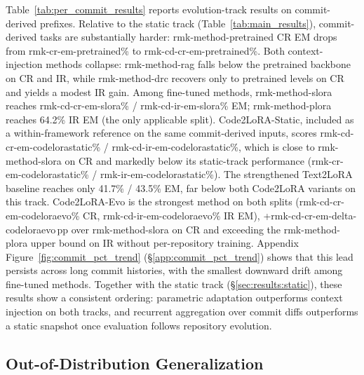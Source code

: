 \documentclass{llmxive}
\providecommand{\UseMacro}[1]{\csname rmk-#1\endcsname}
\providecommand{\codelora}{Code2LoRA\xspace}
\providecommand{\codelorastatic}{\codelora-Static\xspace}
\providecommand{\codeloraevo}{\codelora-Evo\xspace}
\providecommand{\textlora}{Text2LoRA\xspace}
\begin{document}
Table~\ref{tab:per_commit_results} reports evolution-track results on commit-derived prefixes.
Relative to the static track (Table~\ref{tab:main_results}), commit-derived tasks are substantially harder: \UseMacro{method-pretrained} CR EM drops from \UseMacro{cr-em-pretrained}\% to \UseMacro{cd-cr-em-pretrained}\%.
Both context-injection methods collapse: \UseMacro{method-rag} falls below the pretrained backbone on CR and IR, while \UseMacro{method-drc} recovers only to pretrained levels on CR and yields a modest IR gain.
Among fine-tuned methods, \UseMacro{method-slora} reaches \UseMacro{cd-cr-em-slora}\% / \UseMacro{cd-ir-em-slora}\% EM; \UseMacro{method-plora} reaches 64.2\% IR EM (the only applicable split).
\codelorastatic{}, included as a within-framework reference on the same commit-derived inputs, scores \UseMacro{cd-cr-em-codelorastatic}\% / \UseMacro{cd-ir-em-codelorastatic}\%, which is close to \UseMacro{method-slora} on CR and markedly below its static-track performance (\UseMacro{cr-em-codelorastatic}\% / \UseMacro{ir-em-codelorastatic}\%). %
The strengthened \textlora{} baseline reaches only 41.7\% / 43.5\% EM, far below both \codelora{} variants on this track.
\codeloraevo{} is the strongest method on both splits (\UseMacro{cd-cr-em-codeloraevo}\% CR, \UseMacro{cd-ir-em-codeloraevo}\% IR EM), +\UseMacro{cd-cr-em-delta-codeloraevo}\,pp over \UseMacro{method-slora} on CR and exceeding the \UseMacro{method-plora} upper bound on IR without per-repository training.
Appendix Figure~\ref{fig:commit_pct_trend} (\S\ref{app:commit_pct_trend}) shows that this lead persists across long commit histories, with the smallest downward drift among fine-tuned methods.
Together with the static track (\S\ref{sec:results:static}), these results show a consistent ordering: parametric adaptation outperforms context injection on both tracks, and recurrent aggregation over commit diffs outperforms a static snapshot once evaluation follows repository evolution.

\subsection{Out-of-Distribution Generalization}
\label{sec:results:ood}
\end{document}

